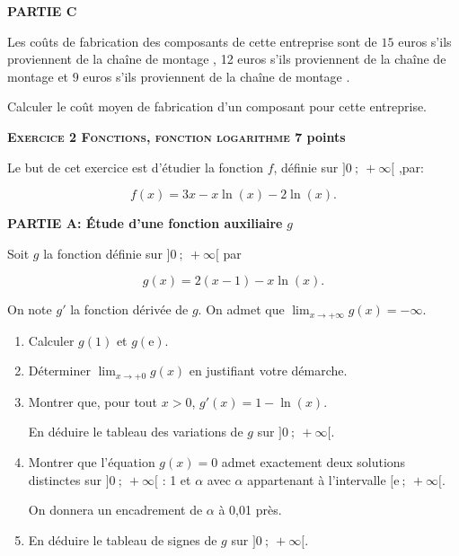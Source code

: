 \documentclass[10pt,a4paper]{article}
\begin{document}
\medskip

\textbf{PARTIE C}

\medskip

Les coûts de fabrication des composants de cette entreprise sont de $15$ euros s'ils proviennent de la chaîne de montage , 12 euros s'ils proviennent de la chaîne de montage  et $9$ euros s'ils proviennent de la chaîne de montage .

Calculer le coût moyen de fabrication d'un composant pour cette entreprise.

\bigskip

\textbf{\textsc{Exercice 2 Fonctions, fonction logarithme} \hfill 7 points}

\medskip

Le but de cet exercice est d'étudier la fonction $f$, définie sur $]0~;~ +\infty[$ ,par:

\[f(x) = 3x - x \ln (x) - 2 \ln (x).\]

\smallskip

\textbf{PARTIE A: Étude d'une fonction auxiliaire }\boldmath $g$ \unboldmath

\medskip

Soit $g$ la fonction définie sur $]0~;~+\infty[$ par 

\[g(x) = 2(x - 1) - x \ln (x).\]

On note $g'$ la fonction dérivée de $g$. On admet que $\displaystyle\lim_{x \to + \infty} g(x) = - \infty$.

\medskip

\begin{enumerate}
\item Calculer $g(1)$ et $g(\text{e})$.
\item Déterminer $\displaystyle\lim_{x \to + 0} g(x)$ en justifiant votre démarche.
\item Montrer que, pour tout $x > 0$,\: $g'(x) = 1 - \ln (x)$.

En déduire le tableau des variations de $g$ sur $]0~;~ +\infty[$.
\item Montrer que l'équation $g(x) = 0$ admet exactement deux solutions distinctes sur
$]0~;~ +\infty[$ : 1 et $\alpha$ avec $\alpha$ appartenant à l'intervalle $[\text{e}~;~+\infty[$.

On donnera un encadrement de $\alpha$ à 0,01 près.
\item En déduire le tableau de signes de $g$ sur $]0~;~ +\infty[$.
\end{enumerate}
\end{document}
